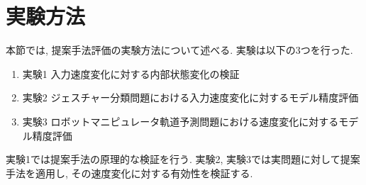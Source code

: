 \section{実験方法}
本節では, 提案手法評価の実験方法について述べる.
実験は以下の3つを行った.
\begin{enumerate}
    \item 実験1 入力速度変化に対する内部状態変化の検証
    \item 実験2 ジェスチャー分類問題における入力速度変化に対するモデル精度評価
    \item 実験3 ロボットマニピュレータ軌道予測問題における速度変化に対するモデル精度評価
\end{enumerate}

実験1では提案手法の原理的な検証を行う.
実験2, 実験3では実問題に対して提案手法を適用し, その速度変化に対する有効性を検証する.





